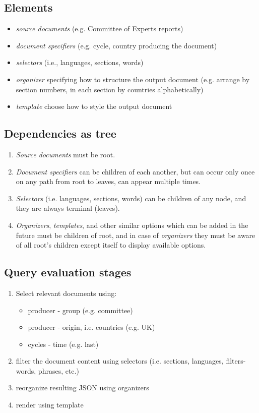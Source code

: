 \documentclass[a4paper]{tufte-book}
\begin{document}
\subsection{Elements}
\begin{itemize}
  \item \emph{source documents} (e.g. Committee of Experts reports)
  \item \emph{document specifiers} (e.g. cycle, country producing the document)
  \item \emph{selectors} (i.e., languages, sections, words)
  \item \emph{organizer} specifying how to structure the output document (e.g. arrange by section numbers, in each section by countries alphabetically)
  \item \emph{template} choose how to style the output document
\end{itemize}

\subsection{Dependencies as tree}
\begin{enumerate}
  \item \emph{Source documents} must be root.
  \item \emph{Document specifiers} can be children of each another, but can occur only once on any path from root to leaves, can appear multiple times.
  \item \emph{Selectors} (i.e. languages, sections, words) can be children of any node, and they are always terminal (leaves).
  \item \emph{Organizers}, \emph{templates}, and other similar options which can be added in the future must be children of root, and in case of \emph{organizers} they must be aware of all root's children except itself to display available options.
\end{enumerate}

\subsection{Query evaluation stages}
\begin{enumerate}
  \item Select relevant documents using:
  \begin{itemize}
    \item producer - group (e.g. committee)
    \item producer - origin, i.e. countries (e.g. UK)
    \item cycles - time (e.g. last)
  \end{itemize}
  \item filter the document content using selectors (i.e. sections, languages, filters- words, phrases, etc.)
  \item reorganize resulting JSON using organizers
  \item render using template
\end{enumerate}
\end{document}
